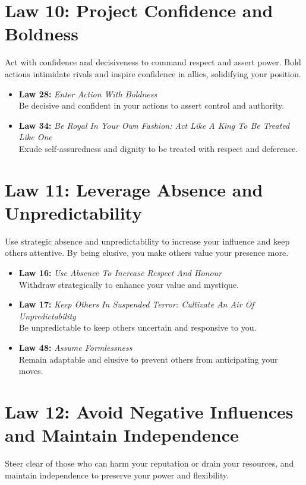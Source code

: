 \documentclass[a4paper,10.8pt]{article}
\begin{document}
\section*{Law 10: Project Confidence and Boldness}
Act with confidence and decisiveness to command respect and assert power. Bold actions intimidate rivals and inspire confidence in allies, solidifying your position.

\begin{itemize}[leftmargin=*, label={--}]
    \item \textbf{Law 28:} \textit{Enter Action With Boldness} \\
    Be decisive and confident in your actions to assert control and authority.
    
    \item \textbf{Law 34:} \textit{Be Royal In Your Own Fashion: Act Like A King To Be Treated Like One} \\
    Exude self-assuredness and dignity to be treated with respect and deference.
\end{itemize}

\section*{Law 11: Leverage Absence and Unpredictability}
Use strategic absence and unpredictability to increase your influence and keep others attentive. By being elusive, you make others value your presence more.

\begin{itemize}[leftmargin=*, label={--}]
    \item \textbf{Law 16:} \textit{Use Absence To Increase Respect And Honour} \\
    Withdraw strategically to enhance your value and mystique.
    
    \item \textbf{Law 17:} \textit{Keep Others In Suspended Terror: Cultivate An Air Of Unpredictability} \\
    Be unpredictable to keep others uncertain and responsive to you.
    
    \item \textbf{Law 48:} \textit{Assume Formlessness} \\
    Remain adaptable and elusive to prevent others from anticipating your moves.
\end{itemize}

\section*{Law 12: Avoid Negative Influences and Maintain Independence}
Steer clear of those who can harm your reputation or drain your resources, and maintain independence to preserve your power and flexibility.
\end{document}
